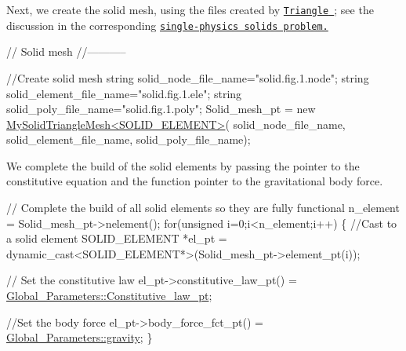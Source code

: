 Next, we create the solid mesh, using the files created by \href{http://www.cs.cmu.edu/~quake/triangle.html}{\tt {\ttfamily Triangle} }; see the discussion in the corresponding \href{../../../solid/unstructured_solid/html/index.html#mesh}{\tt single-\/physics solids problem.}


\begin{DoxyCodeInclude}
 
 
 \textcolor{comment}{// Solid mesh}
 \textcolor{comment}{//-----------}
 
 \textcolor{comment}{//Create solid mesh}
 \textcolor{keywordtype}{string} solid\_node\_file\_name=\textcolor{stringliteral}{"solid.fig.1.node"};
 \textcolor{keywordtype}{string} solid\_element\_file\_name=\textcolor{stringliteral}{"solid.fig.1.ele"};
 \textcolor{keywordtype}{string} solid\_poly\_file\_name=\textcolor{stringliteral}{"solid.fig.1.poly"}; 
 Solid\_mesh\_pt = \textcolor{keyword}{new} \hyperlink{classMySolidTriangleMesh}{MySolidTriangleMesh<SOLID\_ELEMENT>}(
      solid\_node\_file\_name,
                                                     solid\_element\_file\_name,
                                                     solid\_poly\_file\_name);

\end{DoxyCodeInclude}


We complete the build of the solid elements by passing the pointer to the constitutive equation and the function pointer to the gravitational body force.


\begin{DoxyCodeInclude}

 
 \textcolor{comment}{// Complete the build of all solid elements so they are fully functional}
 n\_element = Solid\_mesh\_pt->nelement();
 \textcolor{keywordflow}{for}(\textcolor{keywordtype}{unsigned} i=0;i<n\_element;i++)
  \{
   \textcolor{comment}{//Cast to a solid element}
   SOLID\_ELEMENT *el\_pt = 
    \textcolor{keyword}{dynamic\_cast<}SOLID\_ELEMENT*\textcolor{keyword}{>}(Solid\_mesh\_pt->element\_pt(i));

   \textcolor{comment}{// Set the constitutive law}
   el\_pt->constitutive\_law\_pt() =
    \hyperlink{namespaceGlobal__Parameters_adbd1f040f375c96fe56b3f475f7dbec2}{Global\_Parameters::Constitutive\_law\_pt};
   
   \textcolor{comment}{//Set the body force}
   el\_pt->body\_force\_fct\_pt() = \hyperlink{namespaceGlobal__Parameters_a200109847bf4cc26da4d00e8d68d569e}{Global\_Parameters::gravity};
  \}

\end{DoxyCodeInclude}


